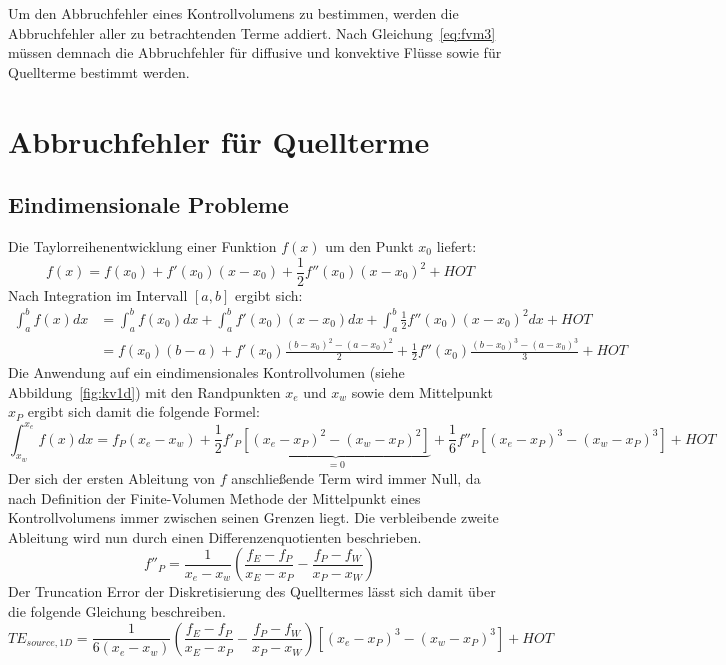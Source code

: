 Um den Abbruchfehler eines Kontrollvolumens zu bestimmen, werden die
Abbruchfehler aller zu betrachtenden Terme addiert. Nach Gleichung~\eqref{eq:fvm3}
müssen demnach die Abbruchfehler für diffusive und konvektive Flüsse sowie
für Quellterme bestimmt werden.


\section{Abbruchfehler für Quellterme}
\label{sec:Quellterm}

\subsection{Eindimensionale Probleme}
\label{sec:source1d}
Die Taylorreihenentwicklung einer Funktion $f(x)$ um den Punkt $x_0$
liefert:
\begin{equation*}
  f(x) = f(x_0) + f'(x_0)(x-x_0) + \frac{1}{2} f''(x_0)(x-x_0)^2 + HOT
\end{equation*}
Nach Integration im Intervall $[a, b]$ ergibt sich:
\begin{align*}
  \int_a^b f(x) dx &= \int_a^b f(x_0) dx + \int_a^b f'(x_0)(x-x_0) dx
+ \int_a^b \frac{1}{2} f''(x_0)(x-x_0)^2 dx + HOT\\
&= f(x_0) (b-a) + f'(x_0) \frac{(b-x_0)^2-(a-x_0)^2}{2}
+ \frac{1}{2} f''(x_0) \frac{(b-x_0)^3-(a-x_0)^3}{3} +HOT
\end{align*}
Die Anwendung auf ein eindimensionales Kontrollvolumen (siehe Abbildung~\ref{fig:kv1d}) mit den Randpunkten $x_e$ und
$x_w$ sowie dem Mittelpunkt $x_P$ ergibt sich damit die folgende Formel:
\begin{equation*}
  \int_{x_w}^{x_e} f(x)dx = f_P(x_e-x_w)
  + \frac{1}{2} f'_P \underbrace{\left[{(x_e-x_P)^2-(x_w-x_P)^2}\right]}_{=0}
+ \frac{1}{6} f''_P \left[{{(x_e-x_P)}^3-{(x_w-x_P)}^3}\right] + HOT
\end{equation*}
Der sich der ersten Ableitung von $f$ anschließende Term wird immer Null, da nach
Definition der Finite-Volumen Methode der Mittelpunkt eines Kontrollvolumens immer
zwischen seinen Grenzen liegt.
Die verbleibende zweite Ableitung wird nun durch einen Differenzenquotienten
beschrieben.
\begin{equation}
  \label{eq:diskretisierung_f''P}
  f''_P = \frac{1}{x_e-x_w}\left(\frac{f_E-f_P}{x_E-x_P}-\frac{f_P-f_W}{x_P-x_W}\right)
\end{equation}
Der Truncation Error der Diskretisierung des Quelltermes lässt sich damit über die
folgende Gleichung beschreiben.
\begin{equation}
  TE_{source,1D} =
\frac{1}{6(x_e-x_w)}\left(\frac{f_E-f_P}{x_E-x_P}-\frac{f_P-f_W}{x_P-x_W}\right)
\left[{{(x_e-x_P)}^3-{(x_w-x_P)}^3}\right] + HOT\label{eq:te_source1}
\end{equation}


